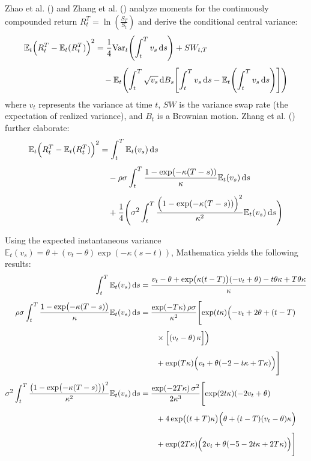 Zhao et al. (\citeyear{zhaoRelationPhysicalRiskneutral2013}) and Zhang et al.  (\citeyear{zhangSkewnessImpliedHeston2017}) analyze moments for the continuously compounded return $R_t^T = \ln\left(\frac{S_T}{S_t}\right)$ and derive the conditional central variance:
\begin{align}
    \mathbb{E}_t\Bigl(R_t^T-\mathbb{E}_t(R_t^T)\Bigr)^2 
    &= \frac{1}{4}\text{Var}_t\Biggl(\int_t ^T v_s\,\mathrm{d}s\Biggr) + SW_{t,T} \notag\\[1ex]
    &\quad - \mathbb{E}_t\Biggl(
        \int_t^T \sqrt{v_s}\,\mathrm{d}B_s
        \Biggl[\int_t^T v_s\,\mathrm{d}s-\mathbb{E}_t\Biggl(\int_t^T v_s\,\mathrm{d}s\Biggr)\Biggr]
    \Biggr) \notag
\end{align}    
where $v_t$ represents the variance at time $t$, $SW$ is the variance swap rate (the expectation of realized variance), and $B_t$ is a Brownian motion. Zhang et al. (\citeyear{zhangSkewnessImpliedHeston2017}) further elaborate:
\begin{align}
    \mathbb{E}_t\Bigl(R_t^T-\mathbb{E}_t(R_t^T)\Bigr)^2 &= \int_t^T \mathbb{E}_t(v_s)\,\mathrm{d}s \notag\\[1ex]
    &\quad - \rho\sigma\int_t^T \frac{1-\exp(-\kappa(T-s))}{\kappa}\mathbb{E}_t(v_s)\,\mathrm{d}s \notag\\[1ex]
    &\quad + \frac{1}{4}\Biggl(\sigma^2\int_t^T\frac{\Bigl(1-\exp(-\kappa(T-s))\Bigr)^2}{\kappa^2}\mathbb{E}_t(v_s) \,\mathrm{d}s\Biggr) \notag
\end{align}
    
Using the expected instantaneous variance $\mathbb{E}_t(v_s) = \theta + (v_t - \theta)\exp(-\kappa(s-t))$, Mathematica yields the following results:
\begin{align}
    \int_t^T \mathbb{E}_t(v_s)\,\mathrm{d}s 
    &= \frac{v_t - \theta + \exp\bigl(\kappa(t-T)\bigr)(-v_t+\theta) - t \theta\kappa + T\theta\kappa}{\kappa} \notag \\[1ex]
    \rho\sigma\int_t^T \frac{1-\exp\bigl(-\kappa(T-s)\bigr)}{\kappa}\mathbb{E}_t(v_s)\,\mathrm{d}s 
    &= \frac{\exp(-T\kappa)\,\rho\sigma}{\kappa^2} \Biggl[
        \exp(t\kappa)\Bigl(-v_t+2\theta+(t-T)
        \notag\\[1ex]
    &\quad\quad\times \Bigl[(v_t-\theta)\,\kappa\Bigr]\Bigr) \notag\\[1ex]
    &\quad\quad + \exp(T\kappa)\Bigl(v_t+\theta(-2-t\kappa+T\kappa)\Bigr)
    \Biggr] \notag \\[1ex]
    \sigma^2\int_t^T\frac{\bigl(1-\exp\bigl(-\kappa(T-s)\bigr)\bigr)^2}{\kappa^2}\mathbb{E}_t(v_s) \,\mathrm{d}s 
    &= \frac{\exp(-2T\kappa)\,\sigma^2}{2\kappa^3} \Biggl[
        \exp(2t\kappa)(-2v_t+\theta) \notag\\[1ex]
    &\quad\quad + 4\exp\bigl((t+T)\kappa\bigr)\Bigl(\theta+(t-T)(v_t-\theta)\kappa\Bigr) \notag\\[1ex]
    &\quad\quad + \exp(2T\kappa)\Bigl(2v_t+\theta(-5-2t\kappa+2T\kappa)\Bigr)
    \Biggr] \notag
\end{align}
    
